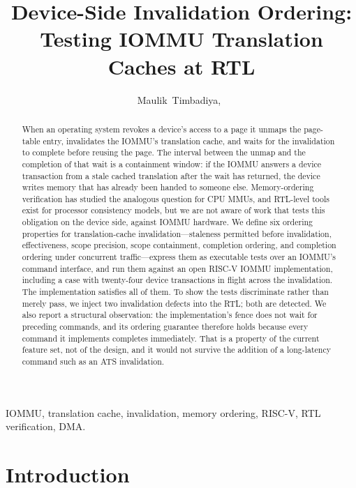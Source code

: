 \documentclass[journal]{IEEEtran}
\begin{document}
\title{Device-Side Invalidation Ordering:\\Testing IOMMU Translation Caches at RTL}
\author{Maulik~Timbadiya,~}
\maketitle

\begin{abstract}
When an operating system revokes a device's access to a page it unmaps the
page-table entry, invalidates the IOMMU's translation cache, and waits for the
invalidation to complete before reusing the page. The interval between the
unmap and the completion of that wait is a containment window: if the IOMMU
answers a device transaction from a stale cached translation after the wait has
returned, the device writes memory that has already been handed to someone else.
Memory-ordering verification has studied the analogous question for CPU MMUs,
and RTL-level tools exist for processor consistency models, but we are not aware
of work that tests this obligation on the device side, against IOMMU hardware.
We define six ordering properties for translation-cache invalidation---staleness
permitted before invalidation, effectiveness, scope precision, scope
containment, completion ordering, and completion ordering under concurrent
traffic---express them as executable tests over an
IOMMU's command interface, and run them against an open RISC-V IOMMU
implementation, including a case with twenty-four device transactions in flight
across the invalidation. The implementation satisfies all of them. To show the
tests discriminate rather than merely pass, we inject two invalidation defects
into the RTL; both are detected. We also report a structural observation: the
implementation's fence does not wait for preceding commands, and its ordering
guarantee therefore holds because every command it implements completes
immediately. That is a property of the current feature set, not of the design,
and it would not survive the addition of a long-latency command such as an ATS
invalidation.
\end{abstract}

\begin{IEEEkeywords}
IOMMU, translation cache, invalidation, memory ordering, RISC-V, RTL
verification, DMA.
\end{IEEEkeywords}

\section{Introduction}
\end{document}
